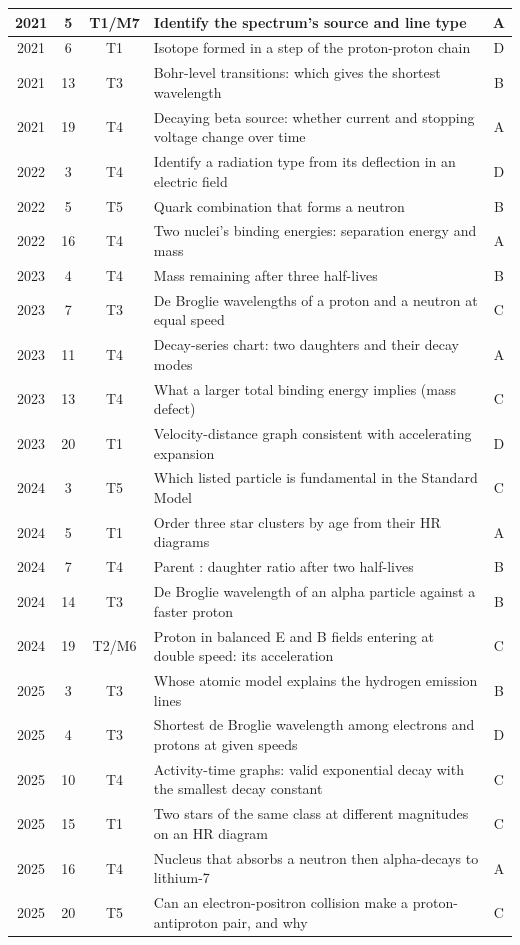 \documentclass[12pt]{article}
\begin{document}
{\begin{longtable}{|c|c|c|p{108mm}|c|}
    2021 & 5 & T1/\allowbreak M7 & Identify the spectrum's source and line type & A\\ \hline
    2021 & 6 & T1 & Isotope formed in a step of the proton-proton chain & D\\ \hline
    2021 & 13 & T3 & Bohr-level transitions: which gives the shortest wavelength & B\\ \hline
    2021 & 19 & T4 & Decaying beta source: whether current and stopping voltage change over time & A\\ \hline
    2022 & 3 & T4 & Identify a radiation type from its deflection in an electric field & D\\ \hline
    2022 & 5 & T5 & Quark combination that forms a neutron & B\\ \hline
    2022 & 16 & T4 & Two nuclei's binding energies: separation energy and mass & A\\ \hline
    2023 & 4 & T4 & Mass remaining after three half-lives & B\\ \hline
    2023 & 7 & T3 & De Broglie wavelengths of a proton and a neutron at equal speed & C\\ \hline
    2023 & 11 & T4 & Decay-series chart: two daughters and their decay modes & A\\ \hline
    2023 & 13 & T4 & What a larger total binding energy implies (mass defect) & C\\ \hline
    2023 & 20 & T1 & Velocity-distance graph consistent with accelerating expansion & D\\ \hline
    2024 & 3 & T5 & Which listed particle is fundamental in the Standard Model & C\\ \hline
    2024 & 5 & T1 & Order three star clusters by age from their HR diagrams & A\\ \hline
    2024 & 7 & T4 & Parent : daughter ratio after two half-lives & B\\ \hline
    2024 & 14 & T3 & De Broglie wavelength of an alpha particle against a faster proton & B\\ \hline
    2024 & 19 & T2/\allowbreak M6 & Proton in balanced E and B fields entering at double speed: its acceleration & C\\ \hline
    2025 & 3 & T3 & Whose atomic model explains the hydrogen emission lines & B\\ \hline
    2025 & 4 & T3 & Shortest de Broglie wavelength among electrons and protons at given speeds & D\\ \hline
    2025 & 10 & T4 & Activity-time graphs: valid exponential decay with the smallest decay constant & C\\ \hline
    2025 & 15 & T1 & Two stars of the same class at different magnitudes on an HR diagram & C\\ \hline
    2025 & 16 & T4 & Nucleus that absorbs a neutron then alpha-decays to lithium-7 & A\\ \hline
    2025 & 20 & T5 & Can an electron-positron collision make a proton-antiproton pair, and why & C\\ \hline
\end{longtable}}
\end{document}

